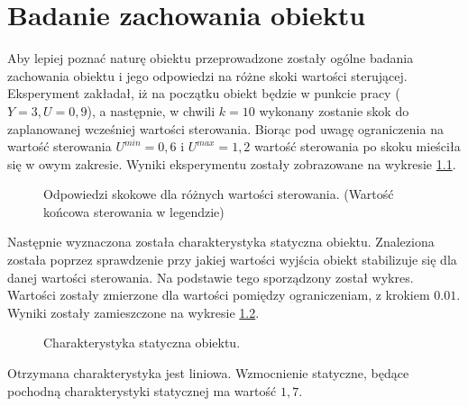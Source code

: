 \chapter{Badanie zachowania obiektu}
\label{sec:zad2}
Aby lepiej poznać naturę obiektu przeprowadzone zostały ogólne badania
zachowania obiektu i jego odpowiedzi na różne skoki wartości sterującej.
Eksperyment zakładał, iż na początku obiekt będzie w punkcie pracy
($Y = 3, U = 0,9$), a następnie, w chwili $k = 10$ wykonany zostanie skok
do zaplanowanej wcześniej wartości sterowania. Biorąc pod uwagę ograniczenia
na wartość sterowania $U^{min} = 0,6$ i $U^{max} = 1,2$ wartość sterowania
po skoku mieściła się w owym zakresie. Wyniki eksperymentu zostały zobrazowane
na wykresie \ref{fig:skoki}.

\begin{figure}[tb]
\centering
{}
\caption{Odpowiedzi skokowe dla różnych wartości sterowania.
(Wartość końcowa sterowania w legendzie)}
\label{fig:skoki}
\end{figure}

Następnie wyznaczona została charakterystyka statyczna obiektu. Znaleziona
została poprzez sprawdzenie przy jakiej wartości wyjścia obiekt stabilizuje
się dla danej wartości sterowania. Na podstawie tego sporządzony został wykres.
Wartości zostały zmierzone dla wartości pomiędzy ograniczeniam, z krokiem $0.01$.
Wyniki zostały zamieszczone na wykresie \ref{fig:char_stat}.
\begin{figure}[tb]
\centering
{}
\caption{Charakterystyka statyczna obiektu.}
\label{fig:char_stat}
\end{figure}
Otrzymana charakterystyka jest liniowa. Wzmocnienie statyczne, będące pochodną
charakterystyki statycznej ma wartość $1,7$.
